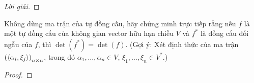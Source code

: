 \documentclass[class=linearalgebra,crop=false]{standalone}
\begin{document}
\begin{proof}[Lời giải]
\end{proof}

\begin{exercise}
    \par Không dùng ma trận của tự đồng cấu, hãy chứng minh trực tiếp rằng nếu $f$ là một tự đồng cấu của không gian vector hữu hạn chiều $V$ và $f^{*}$ là đồng cấu đối ngẫu của $f$, thì $\det(f^{*}) = \det(f)$. (Gợi ý: Xét định thức của ma trận $\left(\left\langle{\alpha_{i},\xi_{j}}\right\rangle\right)_{n\times n}$, trong đó $\alpha_{1},\ldots,\alpha_{n}\in V$, $\xi_{1},\ldots,\xi_{n}\in V^{*}$.)
\end{exercise}

\begin{proof}
\end{proof}
\end{document}
